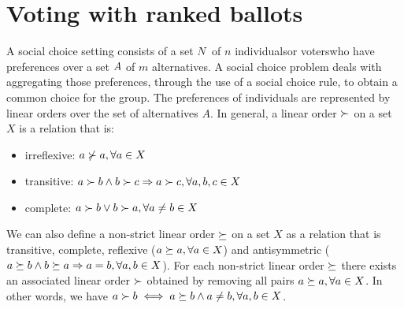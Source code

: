 
\section{Voting with ranked ballots}

A social choice setting consists of a set $N$ of $n$ individuals\textemdash or voters\textemdash who have preferences over a set $A$ of $m$ alternatives.
A social choice problem deals with aggregating those preferences, through the use of a social choice rule, to obtain a common choice for the group.
The preferences of individuals are represented by linear orders over the set of alternatives $A$.
In general, a linear order $\mathop{\succ}$ on a set $X$ is a relation that is:
\vspace{-0.3em}
\begin{itemize}
	\itemsep-0.5em 
	\item irreflexive: $a \not\succ a, \forall a \in X$
	\item transitive: $a \succ b \land b \succ c \Rightarrow a \succ c, \forall a,b,c \in X$
	\item complete: $a \succ b \lor b \succ a, \forall a \neq b \in X$
\end{itemize} 
\vspace{-0.3em}
We can also define a non-strict linear order $\mathop{\succeq}$ on a set $X$ as a relation that is transitive, complete, reflexive ($a \succeq a, \forall a \in X$) and antisymmetric ($a \succeq b \land b \succeq a \Rightarrow a = b, \forall a,b \in X$).
For each non-strict linear order $\succeq$ there exists an associated linear order $\succ$ obtained by removing all pairs $a \succeq a, \forall a \in X$. In other words, we have $a \succ b \iff a \succeq b \land a \neq b, \forall a,b \in X$.

